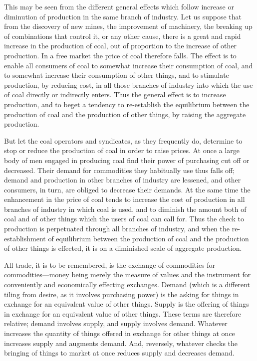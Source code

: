 \documentclass{book}
\begin{document}
This may be seen from the different general effects which follow increase or diminution of production in the same branch of industry. Let us suppose that from the discovery of new mines, the improvement of machinery, the breaking up of combinations that control it, or any other cause, there is a great and rapid increase in the production of coal, out of proportion to the increase of other production. In a free market the price of coal therefore falls. The effect is to enable all consumers of coal to somewhat increase their consumption of coal, and to somewhat increase their consumption of other things, and to stimulate production, by reducing cost, in all those branches of industry into which the use of coal directly or indirectly enters. Thus the general effect is to increase production, and to beget a tendency to re-establish the equilibrium between the production of coal and the production of other things, by raising the aggregate production.

But let the coal operators and syndicates, as they frequently do, determine to stop or reduce the production of coal in order to raise prices. At once a large body of men engaged in producing coal find their power of purchasing cut off or decreased. Their demand for commodities they habitually use thus falls off; demand and production in other branches of industry are lessened, and other consumers, in turn, are obliged to decrease their demands. At the same time the enhancement in the price of coal tends to increase the cost of production in all branches of industry in which coal is used, and to diminish the amount both of coal and of other things which the users of coal can call for. Thus the check to production is perpetuated through all branches of industry, and when the re-establishment of equilibrium between the production of coal and the production of other things is effected, it is on a diminished scale of aggregate production.

All trade, it is to be remembered, is the exchange of commodities for commodities—money being merely the measure of values and the instrument for conveniently and economically effecting exchanges. Demand (which is a different tiling from desire, as it involves purchasing power) is the asking for things in exchange for an equivalent value of other things. Supply is the offering of things in exchange for an equivalent value of other things. These terms are therefore relative; demand involves supply, and supply involves demand. Whatever increases the quantity of things offered in exchange for other things at once increases supply and augments demand. And, reversely, whatever checks the bringing of things to market at once reduces supply and decreases demand.
\end{document}
